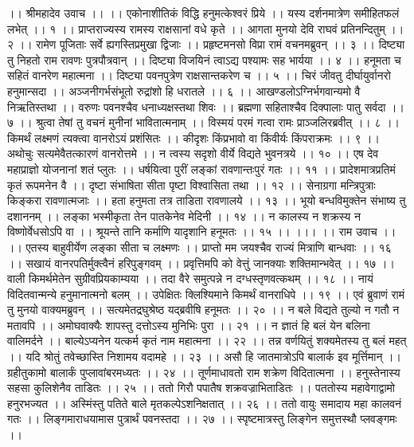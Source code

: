 ।। श्रीमहादेव उवाच ।। ।।
एकोनाशीतिकं विद्धि हनुमत्केश्वरं प्रिये ।।
यस्य दर्शनमात्रेण समीहितफलं लभेत् ।। १ ।।
प्राप्तराज्यस्य रामस्य राक्षसानां वधे कृते ।।
आगता मुनयो देवि राघवं प्रतिनन्दितुम् ।। २ ।।
रामेण पूजिताः सर्वे ह्यगस्तिप्रमुखा द्विजाः ।।
प्रहृष्टमनसो विप्रा रामं वचनमब्रुवन् ।। ३ ।।
दिष्ट्या तु निहतो राम रावणः पुत्रपौत्रवान् ।।
दिष्ट्या विजयिनं त्वाऽद्य पश्यामः सह भार्यया ।। ४ ।।
हनूमता च सहितं वानरेण महात्मना ।।
दिष्ट्या पवनपुत्रेण राक्षसान्तकरेण च ।। ५ ।।
चिरं जीवतु दीर्घायुर्वानरो हनुमान्सदा ।।
अञ्जनीगर्भसंभूतो रुद्रांशो हि धरातले ।। ६ ।।
आखण्डलोऽग्निर्भगवान्यमो वै निऋतिस्तथा ।।
वरुणः पवनश्चैव धनाध्यक्षस्तथा शिवः ।।
ब्रह्मणा सहिताश्चैव दिक्पालाः पातु सर्वदा ।। ७ ।।
श्रुत्वा तेषां तु वचनं मुनीनां भावितात्मनाम् ।।
विस्मयं परमं गत्वा रामः प्राञ्जलिरब्रवीत् ।। ८ ।।
किमर्थं लक्ष्मणं त्यक्त्वा वानरोऽयं प्रशंसितः ।।
कीदृशः किंप्रभावो वा किंवीर्यः किंपराक्रमः ।। ९ ।।
अथोचुः सत्यमेवैतत्कारणं वानरोत्तमे ।।
न त्वस्य सदृशो वीर्ये विद्यते भुवनत्रये ।। १० ।।
एष देव महाप्राज्ञो योजनानां शतं प्लुतः ।।
धर्षयित्वा पुरीं लङ्कां रावणान्तःपुरं गतः ।। ११ ।।
प्रादेशमात्रप्रतिमं कृतं रूपमनेन वै ।।
दृष्टा संभाषिता सीता पृष्टा विश्वासिता तथा ।। १२ ।।
सेनाग्रगा मन्त्रिपुत्राः किङ्करा रावणात्मजाः ।।
हता हनुमता तत्र ताडिता रावणालये ।। १३ ।।
भूयो बन्धविमुक्तेन संभाष्य तु दशाननम् ।।
लङ्का भस्मीकृता तेन पातकेनेव मेदिनी ।। १४ ।।
न कालस्य न शक्रस्य न विष्णोर्वेधसोऽपि वा ।।
श्रूयन्ते तानि कर्माणि यादृशानि हनूमतः ।। १५ ।। ।।।
।। राम उवाच ।। ।।
एतस्य बाहुवीर्येण लङ्का सीता च लक्ष्मणः ।।
प्राप्तो मम जयश्चैव राज्यं मित्राणि बान्धवाः ।। १६ ।।
सखायं वानरपतिर्मुक्त्वैनं हरिपुङ्गवम् ।।
प्रवृत्तिमपि को वेत्तुं जानक्याः शक्तिमान्भवेत् ।। १७ ।।
वाली किमर्थमेतेन सुग्रीवप्रियकाम्यया ।।
तदा वैरे समुत्पन्ने न दग्धस्तृणवत्कथम् ।। १८ ।।
नायं विदितवान्मन्ये हनुमानात्मनो बलम् ।।
उपेक्षितः क्लिश्यिमाने किमर्थं वानराधिपे ।। १९ ।।
एवं ब्रुवाणं रामं तु मुनयो वाक्यमब्रुवन् ।।
सत्यमेतद्रघुश्रेष्ठ यद्ब्रवीषि हनूमतः ।। २० ।।
न बले विद्यते तुल्यो न गतौ न मतावपि ।।
अमोघवाक्यैः शापस्तु दत्तोऽस्य मुनिभिः पुरा ।। २१ ।।
न ज्ञातं हि बलं येन बलिना वालिमर्दने ।।
बाल्येऽप्यनेन यत्कर्म कृतं नाम महात्मना ।। २२ ।।
तन्न वर्णयितुं शक्यमेतस्य तु बलं महत् ।।
यदि श्रोतुं तवेच्छास्ति निशामय वदामहे ।। २३ ।।
असौ हि जातमात्रोऽपि बालार्क इव मूर्त्तिमान् ।।
ग्रहीतुकामो बालार्कं पुप्लावांबरमध्यतः ।। २४ ।।
तूर्णमाधावतो राम शक्रेण विदितात्मना ।।
हनुस्तेनास्य सहसा कुलिशेनैव ताडितः ।। २५ ।।
ततो गिरौ पपातैष शक्रवज्राभिताडितः ।।
पततोस्य महावेगाद्वामो हनुरभज्यत ।।
अस्मिंस्तु पतिते बाले मृतकल्पेऽशनिक्षतात् ।। २६ ।।
ततो वायुः समादाय महा कालवनं गतः ।।
लिङ्गमाराधयामास पुत्रार्थं पवनस्तदा ।। २७ ।।
स्पृष्टमात्रस्तु लिङ्गेन समुत्तस्थौ प्लवङ्गमः ।।
